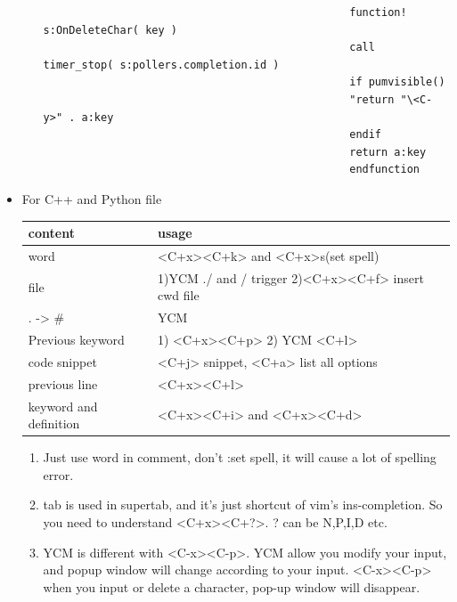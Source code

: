 \documentclass[paper=8.5in:11in, twoside, 12pt, pagesize=pdftex]{book}
\begin{document}
\begin{itemize}
\begin{enumerate}
\begin{verbatim}
												function! s:OnDeleteChar( key )
												call timer_stop( s:pollers.completion.id )
												if pumvisible()
												"return "\<C-y>" . a:key
												endif
												return a:key
												endfunction
											\end{verbatim}
										\end{enumerate}
										
										
										\item For C++ and Python file \\
										
										\begin{tabular}{p{}|p{}}
											\hline 
											content  & usage \\ 
											
											\hline 
											word & <C+x><C+k> and <C+x>s(set spell)\\ 
											
											\hline 
											file & 1)YCM ./ and / trigger 2)<C+x><C+f> insert cwd file  \\ 
											
											\hline 
											. -> \# & YCM \\
											
											\hline
											Previous keyword & 1) <C+x><C+p> 2) YCM <C+l> \\
											
											\hline 
											code snippet & <C+j> snippet, <C+a> list all options\\
											
											\hline
											previous line & <C+x><C+l> \\
											
											\hline
											keyword and definition & <C+x><C+i> and <C+x><C+d> \\
											
											\hline
										\end{tabular}
										\begin{enumerate}
											\item Just use word in comment, don't :set spell, it will cause a lot of spelling error. 
											
											\item tab is used in supertab, and it's just shortcut of vim's ins-completion. So you need to understand <C+x><C+?>. ? can be N,P,I,D etc. 
											
											\item YCM is different with <C-x><C-p>. YCM allow you modify your input, and popup window will change according to your input.  <C-x><C-p> when you input or delete a character, pop-up window will disappear. 
											

\end{enumerate}
\end{itemize}
\end{document}
